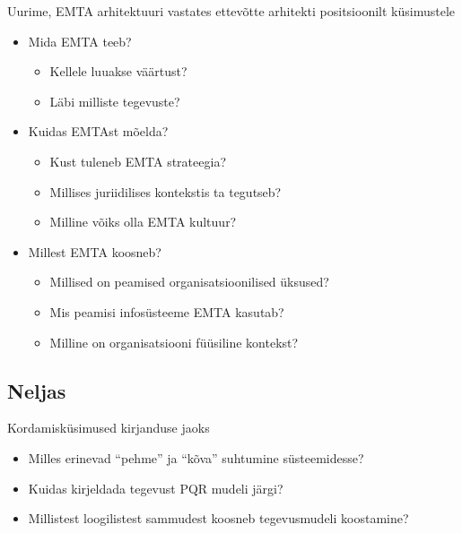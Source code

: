 \documentclass[nobib]{tufte-handout}
\begin{document}
Uurime, EMTA arhitektuuri vastates ettevõtte arhitekti positsioonilt küsimustele
\begin{itemize}
	\item Mida EMTA teeb?
	\begin{itemize}
		\item Kellele luuakse väärtust?
		\item Läbi milliste tegevuste?
	\end{itemize}
	\item Kuidas EMTAst mõelda?
	\begin{itemize}
		\item Kust tuleneb EMTA strateegia?
		\item Millises juriidilises kontekstis ta tegutseb?
		\item Milline võiks olla EMTA kultuur?
	\end{itemize}
	\item Millest EMTA koosneb?
	\begin{itemize}
		\item Millised on peamised organisatsioonilised üksused?
		\item Mis peamisi infosüsteeme EMTA kasutab?
		\item Milline on organisatsiooni füüsiline kontekst?
	\end{itemize}
\end{itemize}

\subsection{Neljas}
Kordamisküsimused kirjanduse jaoks
\begin{itemize}
	\item Milles erinevad \enquote{pehme} ja \enquote{kõva} suhtumine süsteemidesse?
	\item Kuidas kirjeldada tegevust PQR mudeli järgi?
	\item Millistest loogilistest sammudest koosneb tegevusmudeli koostamine?
\end{itemize}
\end{document}
